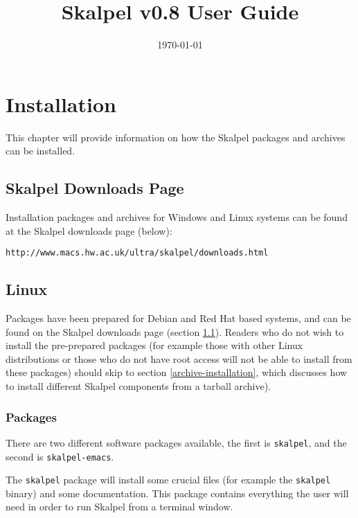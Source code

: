 \documentclass{report}
\title{Skalpel v0.8 User Guide}
\date{\today}
\begin{document}
\maketitle
\vspace{110mm}

\newpage

\tableofcontents

\newpage

\chapter {Installation}
\label{skalpel-installation}

This chapter will provide information on how the Skalpel packages and
archives can be installed.

\section {Skalpel Downloads Page}
\label{skalpel-downloads-page}

Installation packages and archives for Windows and Linux systems can
be found at the Skalpel downloads page (below):

\begin{center}\texttt{http://www.macs.hw.ac.uk/ultra/skalpel/downloads.html}\end{center}

\section {Linux}

Packages have been prepared for Debian and Red Hat based systems, and
can be found on the Skalpel downloads page (section
\ref{skalpel-downloads-page}). Readers who do not wish to install the
pre-prepared packages (for example those with other Linux
distributions or those who do not have root access will not be able to
install from these packages) should skip to section \ref{archive-installation},
which discusses how to install different Skalpel components from a
tarball archive).

\subsection {Packages}

There are two different software packages available, the first is
\texttt{skalpel}, and the second is \texttt{skalpel-emacs}.

The \texttt{skalpel} package will install some crucial files (for
example the \texttt{skalpel} binary) and some documentation. This
package contains everything the user will need in order to run Skalpel
from a terminal window.
\end{document}
